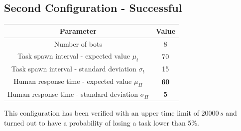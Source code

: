 \documentclass{article}
\begin{document}
		\subsection{Second Configuration - Successful}
			\label{sub:sim2}
			\begin{center}
				\begin{tabular}{ |c|c|}
					\hline
					Parameter & Value\\
					\hline
					\hline
					Number of bots & 8 \\
					\hline
					Task spawn interval - expected value $\mu_t$ & 70\\
					\hline					
					Task spawn interval - standard deviation $\sigma_t$ & 15\\
					\hline
					Human response time - expected value $\mu_H$ & \textbf{60}\footnotemark\\
					\hline					
					Human response time - standard deviation $\sigma_H$ & \textbf{5}\\
					\hline
				\end{tabular}
			\end{center}
			This configuration has been verified with an upper time limit of $20000\,s$ and turned out to have a probability of losing a task lower than 5\%.
			
\end{document}
